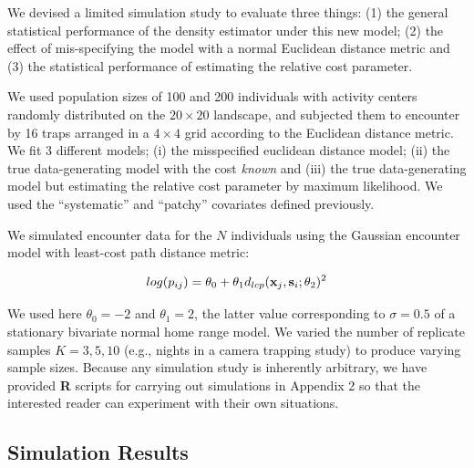 \documentclass[12pt]{article}
\begin{document}
\begin{spacing}{1.8}
We devised a limited simulation study to evaluate three things: (1)
the general statistical performance of the density estimator under
this new model; (2) the effect of mis-specifying the model with a
normal Euclidean distance metric and (3) the statistical performance
of estimating the relative cost parameter.

We used population sizes of 100 and 200 individuals with activity
centers randomly distributed on the $20 \times 20$ landscape, and subjected them
to encounter by 16 traps arranged in a $4\times 4$ grid according to
the Euclidean distance metric. We fit 3 different models; (i) the
misspecified euclidean distance model; (ii) the true data-generating
model with the cost {\it known} and (iii) the true
data-generating model but estimating the relative cost parameter by
maximum likelihood.  We used the ``systematic'' and ``patchy''
covariates defined previously.

We simulated encounter data for the $N$ individuals using the Gaussian
encounter model with least-cost path distance metric:

\[
log(p_{ij})= \theta_{0} + \theta_{1} d_{lcp}({\bf x}_{j},{\bf
  s}_{i}; \theta_{2})^{2}
\]

{\flushleft We } used here $\theta_{0} = -2$ and $\theta_{1} = 2$, the latter value
corresponding to $\sigma = 0.5$ of a stationary bivariate normal home
range model.  We varied the number of replicate samples $K=3,5,10$
(e.g., nights in a camera trapping study) to produce varying sample
sizes.  Because any simulation study is inherently arbitrary, we have
provided {\bf R} scripts for carrying out simulations in Appendix 2 so
that the interested reader can experiment with their own situations.




\subsection{Simulation Results}


\end{spacing}
\end{document}
